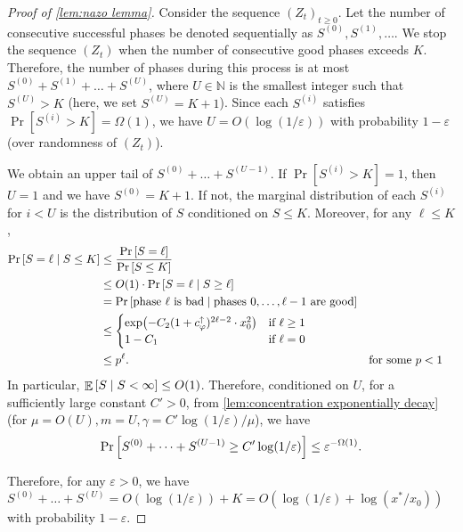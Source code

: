 \documentclass[letterpaper,11pt]{article}
\DeclareMathOperator*{\E}{\mathbb{E}}
\newcommand{\condition}{\;\middle\vert\;}
\newcommand{\Nat}{\mathbb{N}}
\newcommand{\cphiup}{c_\varphi^{\uparrow}}
\begin{document}
\begin{proof}[Proof of \cref{lem:nazo lemma}]
    Consider the sequence $ (Z_t)_{t\ge 0} $.
    Let the number of consecutive successful phases be denoted sequentially as $S^{(0)},S^{(1)},\dots$.
    We stop the sequence $ (Z_t) $ when the number of consecutive good phases exceeds $ K $.
    Therefore, the number of phases during this process is at most $ S^{(0)} + S^{(1)} + \dots + S^{(U)} $,
        where $ U \in \Nat $ is the smallest integer such that $ S^{(U)} > K $ (here, we set $ S^{(U)}=K+1 $).
    Since each $ S^{(i)} $ satisfies $ \Pr[S^{(i)} > K] =\Omega(1)$, we have $ U= O(\log(1/\varepsilon)) $ with probability $ 1-\varepsilon $ (over randomness of $ (Z_t)$).

    We obtain an upper tail of $ S^{(0)} + \dots + S^{(U-1)} $.
    If $ \Pr[S^{(i)} > K] = 1 $, then $ U=1 $ and we have $ S^{(0)} = K+1$.
    If not, the marginal distribution of each $ S^{(i)} $ for $ i<U $ is the distribution of $ S $ conditioned on $ S\le K$.
    Moreover, for any $ \ell \le K$,
    \begin{align*}
        \Pr\qty[ S = \ell \condition S\le K] &\le \frac{\Pr\qty[S=\ell]}{\Pr\qty[S\le K]} \\
        &\le O(1)\cdot \Pr\qty[ S=\ell \condition S\ge \ell ] \\
        &=\Pr\qty[\text{phase $\ell$ is bad} \condition \text{phases $0,\dots,\ell-1$ are good}] \\
        &\le \begin{cases}
            \exp(-C_2 (1+\cphiup)^{2\ell-2}\cdot x_0^2) & \text{if $\ell\ge 1$} \\
            1-C_1 & \text{if $\ell=0$}
        \end{cases} \\
        &\le p^\ell.  & & \text{for some $ p <1$}
    \end{align*}
    In particular, $ \E\qty[S \condition S<\infty] \le O(1) $.
    Therefore, conditioned on $ U $, for a sufficiently large constant $ C'>0 $,
    from \cref{lem:concentration exponentially decay} (for $ \mu = O(U),m=U,\gamma = C'\log(1/\varepsilon)/\mu $),
    we have
    \begin{align*}
        \Pr\qty[ S^{(0)} + \dots +S^{(U-1)} \ge C'\log(1/\varepsilon) ] \le \varepsilon^{-\Omega(1)}.
    \end{align*}

    Therefore, for any $ \varepsilon>0 $, we have $ S^{(0)} + \dots + S^{(U)} = O(\log(1/\varepsilon)) + K = O(\log(1/\varepsilon) + \log(x^*/x_0)) $ with probability $ 1-\varepsilon $.
\end{proof}
\end{document}
